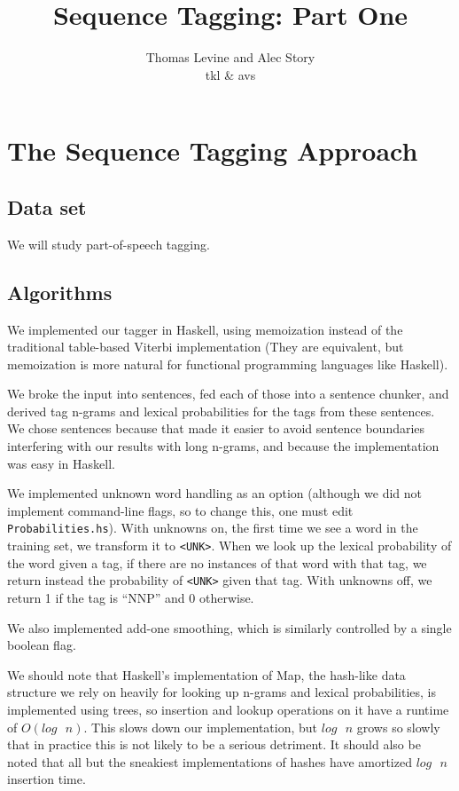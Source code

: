 \documentclass{article}
\title{Sequence Tagging: Part One}
\author{Thomas Levine and Alec Story\\\small{tkl\osn{22} \& avs\osn{38}}}
\begin{document}
\maketitle

\section{The Sequence Tagging Approach}

\subsection{Data set}
We will study part-of-speech tagging.
\subsection{Algorithms}

We implemented our tagger in Haskell, using memoization instead of the
traditional table-based Viterbi implementation (They are equivalent, but
memoization is more natural for functional programming languages like Haskell).

We broke the input into sentences, fed each of those into a sentence chunker,
and derived tag n-grams and lexical probabilities for the tags from these
sentences.  We chose sentences because that made it easier to avoid sentence
boundaries interfering with our results with long n-grams, and because the
implementation was easy in Haskell.

We implemented unknown word handling as an option (although we did not implement
command-line flags, so to change this, one must edit \verb+Probabilities.hs+).
With unknowns on, the first time we see a word in the training set, we transform
it to \verb+<UNK>+.  When we look up the lexical probability of the word given a
tag, if there are no instances of that word with that tag, we return instead the
probability of \verb+<UNK>+ given that tag.  With unknowns off, we return 1 if
the tag is ``NNP'' and 0 otherwise.

We also implemented add-one smoothing, which is similarly controlled by a single
boolean flag.

We should note that Haskell's implementation of Map, the hash-like data
structure we rely on heavily for looking up n-grams and lexical probabilities, is
implemented using trees, so insertion and lookup operations on it have a runtime
of $O(log\text{ } n)$.  This slows down our implementation, but $log\text{ } n$ grows so slowly
that in practice this is not likely to be a serious detriment.  It should also
be noted that all but the sneakiest implementations of hashes have amortized
$log\text{ } n$  insertion time.
\end{document}
